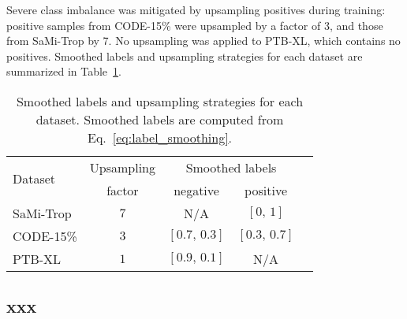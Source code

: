 Severe class imbalance was mitigated by upsampling positives during training: positive samples from CODE-15\% were upsampled by a factor of 3, and those from SaMi-Trop by 7. No upsampling was applied to PTB-XL, which contains no positives. Smoothed labels and upsampling strategies for each dataset are summarized in Table~\ref{tab:augmentation}.

\begin{table}[!htp]
\centering
\begin{tabular}{lcccc}
\toprule
\multirow{2}{*}{Dataset} & Upsampling & \multicolumn{2}{c}{Smoothed labels} \\ \cmidrule(lr){3-4}
& factor & negative & positive \\
\midrule
SaMi-Trop & $7$ & N/A           & $[0,\,1]$     \\
CODE-15\%   & $3$ & $[0.7,\,0.3]$ & $[0.3,\,0.7]$ \\
PTB-XL    & $1$ & $[0.9,\,0.1]$ & N/A           \\
\bottomrule
\end{tabular}
\caption{Smoothed labels and upsampling strategies for each dataset. Smoothed labels are computed from Eq.~\ref{eq:label_smoothing}.}
\label{tab:augmentation}
\end{table}


\subsection{xxx}



\cite{torch_ecg_paper}
